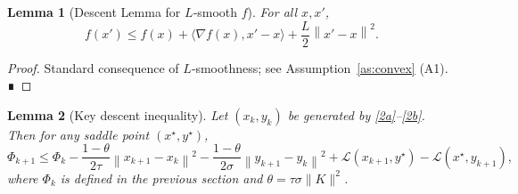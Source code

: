 \documentclass{article}
\newtheorem{lemma}{Lemma}
\newcommand{\norm}[1]{\left\lVert#1\right\rVert}
\begin{document}
\begin{lemma}[Descent Lemma for $L$‑smooth $f$]\label{lem:smooth}
For all $x,x'$,
\[
f(x')\le f(x)+\langle\nabla f(x),x'-x\rangle+\frac{L}{2}\norm{x'-x}^{2}.
\tag{L2}
\]
\end{lemma}
\begin{proof}
Standard consequence of $L$‑smoothness; see Assumption~\ref{as:convex} (A1). ∎
\end{proof}

\begin{lemma}[Key descent inequality]\label{lem:descent}
Let $(x_{k},y_{k})$ be generated by \eqref{2a}–\eqref{2b}. Then for any saddle point $(x^{\star},y^{\star})$,
\[
\Phi_{k+1}\le \Phi_{k}
-\frac{1-\theta}{2\tau}\norm{x_{k+1}-x_{k}}^{2}
-\frac{1-\theta}{2\sigma}\norm{y_{k+1}-y_{k}}^{2}
+\mathcal L(x_{k+1},y^{\star})-\mathcal L(x^{\star},y_{k+1}),
\tag{L3}
\]
where $\Phi_{k}$ is defined in the previous section and $\theta=\tau\sigma\|K\|^{2}$.
\end{lemma}
\end{document}
